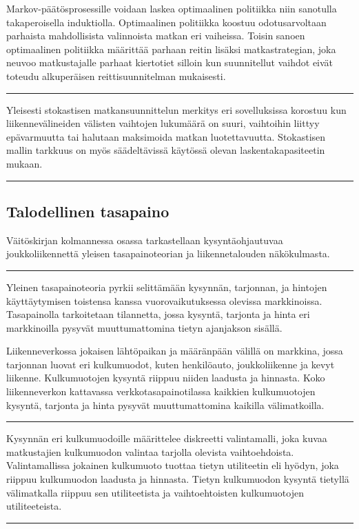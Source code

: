 \documentclass[a4paper,12pt]{article}
\newcommand*\sepline{%
  \begin{center}
    \rule[1ex]{.5\textwidth}{.5pt}
  \end{center}}
\begin{document}
Markov-päätösprosessille voidaan laskea optimaalinen politiikka niin sanotulla takaperoisella induktiolla. Optimaalinen politiikka
koostuu odotusarvoltaan parhaista mahdollisista valinnoista matkan eri vaiheissa. Toisin sanoen optimaalinen politiikka 
määrittää parhaan reitin lisäksi matkastrategian, joka neuvoo matkustajalle parhaat kiertotiet silloin kun 
suunnitellut vaihdot eivät toteudu alkuperäisen reittisuunnitelman mukaisesti.

\sepline

Yleisesti stokastisen matkansuunnittelun merkitys eri sovelluksissa korostuu kun liikennevälineiden välisten vaihtojen lukumäärä on suuri, 
vaihtoihin liittyy epävarmuutta tai halutaan maksimoida matkan luotettavuutta. Stokastisen mallin tarkkuus on myös säädeltävissä
käytössä olevan laskentakapasiteetin mukaan.

\sepline


\subsection*{Talodellinen tasapaino}
Väitöskirjan kolmannessa osassa tarkastellaan kysyntäohjautuvaa joukkoliikennettä yleisen tasapainoteorian ja liikennetalouden näkökulmasta.

\sepline

Yleinen tasapainoteoria pyrkii selittämään kysynnän, tarjonnan, ja hintojen käyttäytymisen toistensa kanssa vuorovaikutuksessa
olevissa markkinoissa. Tasapainolla tarkoitetaan tilannetta, jossa kysyntä, tarjonta ja hinta eri markkinoilla pysyvät muuttumattomina
tietyn ajanjakson sisällä.

Liikenneverkossa jokaisen lähtöpaikan ja määränpään välillä on markkina, jossa tarjonnan luovat eri kulkumuodot, 
kuten henkilöauto, joukkoliikenne ja kevyt liikenne.
Kulkumuotojen kysyntä riippuu niiden laadusta ja hinnasta. Koko liikenneverkon kattavassa verkkotasapainotilassa kaikkien kulkumuotojen
kysyntä, tarjonta ja hinta pysyvät muuttumattomina kaikilla välimatkoilla. 

\sepline

Kysynnän eri kulkumuodoille määrittelee diskreetti valintamalli, joka kuvaa matkustajien kulkumuodon valintaa tarjolla olevista vaihtoehdoista.
Valintamallissa jokainen kulkumuoto tuottaa tietyn utiliteetin eli hyödyn, joka riippuu kulkumuodon laadusta ja hinnasta. 
Tietyn kulkumuodon kysyntä tietyllä välimatkalla riippuu sen utiliteetista ja vaihtoehtoisten kulkumuotojen utiliteeteista.

\sepline
\end{document}
